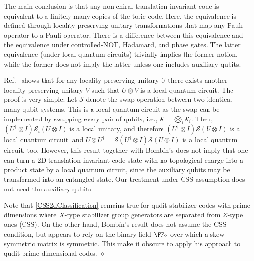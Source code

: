 \begin{rem}
The main conclusion is that any non-chiral translation-invariant code is equivalent
to a finitely many copies of the toric code.
Here, the equivalence is defined through locality-preserving unitary transformations
that map any Pauli operator to a Pauli operator.
There is a difference between this equivalence and the equivalence
under controlled-NOT, Hadamard, and phase gates.
The latter equivalence (under local quantum circuits) trivially implies the former notion,
while the former does not imply the latter unless one includes auxiliary qubits.

Ref.~\cite{ArrighiNesmeWerner2007} shows that 
for any locality-preserving unitary $U$
there exists another locality-preserving unitary $V$
such that
$U \otimes V$ is a local quantum circuit.
The proof is very simple:
Let $\mathcal S$ denote the swap operation
between two identical many-qubit systems.
This is a local quantum circuit as the swap can be implemented by swapping every pair of qubits,
i.e., $\mathcal S = \bigotimes_i \mathcal S_i$.
Then, 
$(U^\dagger \otimes I) \mathcal S_i (U \otimes I)$ is a local unitary,
and therefore $(U^\dagger \otimes I) \mathcal S (U \otimes I)$ is a local quantum circuit,
and
$U \otimes U^\dagger = \mathcal S (U^\dagger \otimes I) \mathcal S (U \otimes I)$
is a local quantum circuit, too.
However, this result together with Bomb\'in's
does not imply that one can turn a 2D translation-invariant code state
with no topological charge
into a product state by a local quantum circuit,
since the auxiliary qubits may be transformed into an entangled state.
Our treatment under CSS assumption
does not need the auxiliary qubits.

Note that \ref{CSS2dClassification} 
remains true for qudit stabilizer codes with prime dimensions
where $X$-type stabilizer group generators are separated from $Z$-type ones (CSS).
On the other hand, Bomb\'in's result does not assume the CSS condition,
but appears to rely on the binary field $\FF_2$
over which a skew-symmetric matrix is symmetric.
This make it obscure to apply his approach to qudit prime-dimensional codes.
\hfill $\diamond$ \end{rem}


